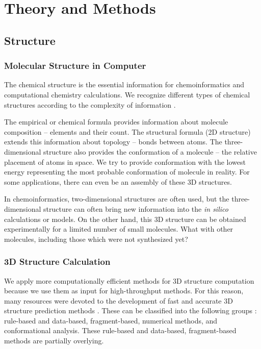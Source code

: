 \part{Theory and Methods}
\label{part:theory}

\chapter{Structure}

\section{Molecular Structure in Computer}

The chemical structure is the essential information for chemoinformatics and
computational chemistry calculations. We recognize different types of chemical
structures according to the complexity of information \cite{Gasteiger2006}. 

The empirical or chemical formula provides information about molecule
composition -- elements and their count. The structural formula (2D structure)
extends this information about topology -- bonds between atoms. The
three-dimensional structure also provides the conformation of a molecule -- the
relative placement of atoms in space. We try to provide conformation with the
lowest energy representing the most probable conformation of molecule
in reality. For some applications, there can even be an assembly of
these 3D structures.

In chemoinformatics, two-dimensional structures are often used, but the
three-di\-men\-sio\-nal structure can often bring new information into the
\textit{in silico} calculations or models. On the other hand, this 3D structure
can be obtained experimentally for a limited number of small molecules. What
with other molecules, including those which were not synthesized yet?

\section{3D Structure Calculation}

We apply more computationally efficient methods for 3D structure computation
because we use them as input for high-throughput methods. For this reason, many
resources were devoted to the development of fast and accurate 3D structure
prediction methods \cite{Sadowski2008}. These can be classified into the following
groups \cite{Sadowski2008}: rule-based and data-based, fragment-based, numerical methods, and
conformational analysis. These rule-based and data-based, fragment-based
methods are partially overlying.

